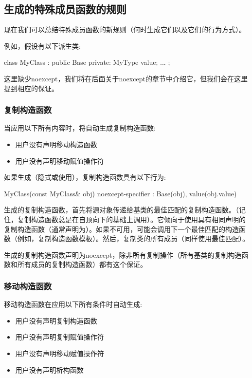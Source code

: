 \subsection{生成的特殊成员函数的规则}

现在我们可以总结特殊成员函数的新规则（何时生成它们以及它们的行为方式）。

例如，假设有以下派生类:

\begin{cppcode}
class MyClass : public Base
{
private:
	MyType value;
	...
};
\end{cppcode}

这里缺少noexcept，我们将在后面关于noexcept的章节中介绍它，但我们会在这里提到相应的保证。

\subsubsection{复制构造函数}

当应用以下所有内容时，将自动生成复制构造函数:

\begin{itemize}
	\item 用户没有声明移动构造函数
	\item 用户没有声明移动赋值操作符
\end{itemize}

如果生成（隐式或使用），复制构造函数具有以下行为:

\begin{cppcode}
MyClass(const MyClass& obj) noexcept-specifier
: Base(obj), value(obj.value) {
}
\end{cppcode}

生成的复制构造函数，首先将源对象传递给基类的最佳匹配的复制构造函数。（记住，复制构造函数总是在自顶向下的基础上调用）。它倾向于使用具有相同声明的复制构造函数（通常声明为）。如果不可用，可能会调用下一个最佳匹配的构造函数（例如，复制构造函数模板）。然后，复制类的所有成员（同样使用最佳匹配）。

生成的复制构造函数声明为noexcept，除非所有复制操作（所有基类的复制构造函数和所有成员的复制构造函数）都有这个保证。

\subsubsection{移动构造函数}

移动构造函数在应用以下所有条件时自动生成:

\begin{itemize}
	\item 用户没有声明复制构造函数
	\item 用户没有声明复制赋值操作符
	\item 用户没有声明移动赋值操作符
	\item 用户没有声明析构函数
\end{itemize}

